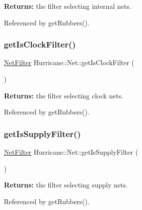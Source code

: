 {\bfseries Returns\+:} the filter selecting internal nets. 

Referenced by get\+Rubbers().

\mbox{\label{classHurricane_1_1Net_afdb2269f3a88923c25264f6f785372a1}} 
\subsubsection{\texorpdfstring{get\+Is\+Clock\+Filter()}{getIsClockFilter()}}
{\footnotesize\ttfamily \hyperlink{namespaceHurricane_a0dfd2c5b40325a919d139091312732e9}{Net\+Filter} Hurricane\+::\+Net\+::get\+Is\+Clock\+Filter (\begin{DoxyParamCaption}{ }\end{DoxyParamCaption})\hspace{0.3cm}{\ttfamily [static]}}

{\bfseries Returns\+:} the filter selecting clock nets. 

Referenced by get\+Rubbers().

\mbox{\label{classHurricane_1_1Net_ac241f44abf1f332004dd6103ee1dfa48}} 
\subsubsection{\texorpdfstring{get\+Is\+Supply\+Filter()}{getIsSupplyFilter()}}
{\footnotesize\ttfamily \hyperlink{namespaceHurricane_a0dfd2c5b40325a919d139091312732e9}{Net\+Filter} Hurricane\+::\+Net\+::get\+Is\+Supply\+Filter (\begin{DoxyParamCaption}{ }\end{DoxyParamCaption})\hspace{0.3cm}{\ttfamily [static]}}

{\bfseries Returns\+:} the filter selecting supply nets. 

Referenced by get\+Rubbers().

\mbox{\label{classHurricane_1_1Net_a332e9b311809f75fc0fa3a5f36acebcc}} 
